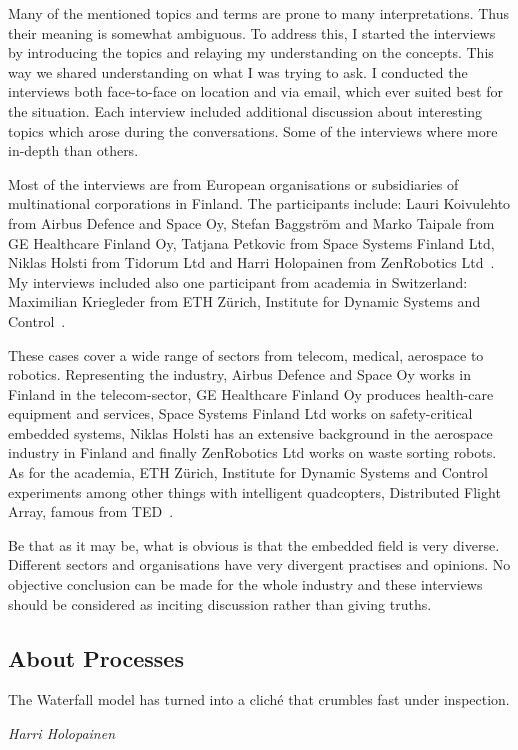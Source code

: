 \documentclass[english]{tktltiki2}
\begin{document}
Many of the mentioned topics and terms are prone to many interpretations. Thus their meaning is somewhat ambiguous. To address this, I started the interviews by introducing the topics and relaying my understanding on the concepts. This way we shared understanding on what I was trying to ask. I conducted the interviews both face-to-face on location and via email, which ever suited best for the situation. Each interview included additional discussion about interesting topics which arose during the conversations. Some of the interviews where more in-depth than others.

Most of the interviews are from European organisations or subsidiaries of multinational corporations in Finland. The participants include: Lauri Koivulehto from Airbus Defence and Space Oy, Stefan Baggström and Marko Taipale from GE Healthcare Finland Oy, Tatjana Petkovic from Space Systems Finland Ltd, Niklas Holsti from Tidorum Ltd and Harri Holopainen from ZenRobotics Ltd~\cite{Koi15, BT15, Pet15, Hol15b, Hol15a}. My interviews included also one participant from academia in Switzerland: Maximilian Kriegleder from ETH Zürich, Institute for Dynamic Systems and Control~\cite{Kri15}.

These cases cover a wide range of sectors from telecom, medical, aerospace to robotics. Representing the industry, Airbus Defence and Space Oy works in Finland in the telecom-sector, GE Healthcare Finland Oy produces health-care equipment and services, Space Systems Finland Ltd works on safety-critical embedded systems, Niklas Holsti has an extensive background in the aerospace industry in Finland and finally ZenRobotics Ltd works on waste sorting robots. As for the academia, ETH Zürich, Institute for Dynamic Systems and Control experiments among other things with intelligent quadcopters, Distributed Flight Array, famous from TED~\cite{Dan13}.

Be that as it may be, what is obvious is that the embedded field is very diverse. Different sectors and organisations have very divergent practises and opinions. No objective conclusion can be made for the whole industry and these interviews should be considered as inciting discussion rather than giving truths.

\subsection{About Processes}

\epigraph{The Waterfall model has turned into a cliché that crumbles fast under inspection.}{\textit{Harri Holopainen~\cite{Hol15a}}}
\end{document}
